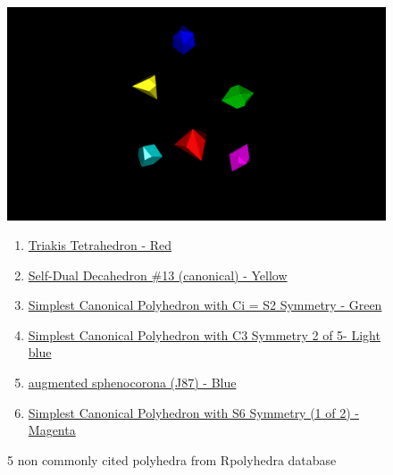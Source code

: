 \documentclass[a4paper,10pt]{article}
\begin{document}
\begin{figure}
 \begin{center}
    \includegraphics[width=15cm]{images/rpolyhedra_ic18_workshop.png}
 \end{center}
\caption{5 non commonly cited polyhedra from Rpolyhedra database}
\begin{enumerate}
\item \href{https://qbotics.shinyapps.io/rpolyhedra-explorer/?%
}{Triakis Tetrahedron - Red}

\item \href{https://qbotics.shinyapps.io/rpolyhedra-explorer/?_inputs_&polyhedron_color=%
}{Self-Dual Decahedron \#13 (canonical) - Yellow} 
\item \href{https://qbotics.shinyapps.io/rpolyhedra-explorer/?_inputs_&polyhedron_color=%
}{Simplest Canonical Polyhedron with Ci = S2 Symmetry - Green }




\item \href{
https://qbotics.shinyapps.io/rpolyhedra-explorer/?_inputs_&polyhedron_color=%
}{Simplest Canonical Polyhedron with C3 Symmetry 2 of 5- Light blue}
\item \href{
https://qbotics.shinyapps.io/rpolyhedra-explorer/?_inputs_&polyhedron_color=%

\item \href{
https://qbotics.shinyapps.io/rpolyhedra-explorer/?_inputs_&polyhedron_color=%
}{Simplest Canonical Polyhedron with S6 Symmetry (1 of 2) - Magenta}
\end{enumerate}
\end{figure}
\end{document}
